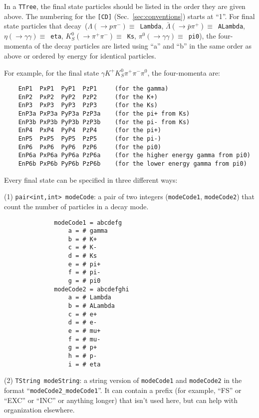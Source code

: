 \documentclass[11pt]{article}
\begin{document}
In a {\tt TTree}, the final state particles should be listed in the order they are given above.  The numbering for the {\tt [CD]} (Sec.~\ref{sec:conventions}) starts at ``1''.  For final state particles that decay~($\Lambda (\to p \pi^-) \equiv $~{\tt Lambda}, 
$\bar{\Lambda} (\to \bar{p} \pi^+) \equiv $~{\tt ALambda}, $\eta (\to \gamma\gamma) \equiv $~{\tt eta}, $K^0_S (\to \pi^+\pi^-) \equiv $~{\tt Ks}, $\pi^0 (\to \gamma\gamma) \equiv $~{\tt pi0}), the four-momenta of the decay particles are listed using ``a'' and ``b'' in the same order as above or ordered by energy for identical particles.

For example, for the final state $\gamma K^+ K^0_S \pi^+ \pi^- \pi^0$, the four-momenta are:
\begin{verbatim}
    EnP1  PxP1  PyP1  PzP1     (for the gamma)
    EnP2  PxP2  PyP2  PzP2     (for the K+)
    EnP3  PxP3  PyP3  PzP3     (for the Ks)
    EnP3a PxP3a PyP3a PzP3a    (for the pi+ from Ks)
    EnP3b PxP3b PyP3b PzP3b    (for the pi- from Ks)
    EnP4  PxP4  PyP4  PzP4     (for the pi+)
    EnP5  PxP5  PyP5  PzP5     (for the pi-)
    EnP6  PxP6  PyP6  PzP6     (for the pi0)
    EnP6a PxP6a PyP6a PzP6a    (for the higher energy gamma from pi0)
    EnP6b PxP6b PyP6b PzP6b    (for the lower energy gamma from pi0)
\end{verbatim}





Every final state can be specified in three different ways:

(1) {\tt pair<int,int> modeCode}: a pair of two integers ({\tt modeCode1}, {\tt modeCode2}) that count the number of particles in a decay mode.
\begin{verbatim}
              modeCode1 = abcdefg
                  a = # gamma
                  b = # K+
                  c = # K-
                  d = # Ks
                  e = # pi+
                  f = # pi-
                  g = # pi0
              modeCode2 = abcdefghi
                  a = # Lambda
                  b = # ALambda
                  c = # e+
                  d = # e-
                  e = # mu+
                  f = # mu-
                  g = # p+
                  h = # p-
                  i = # eta
\end{verbatim}
(2) {\tt TString modeString}: a string version of {\tt modeCode1} and {\tt modeCode2} in the format ``{\tt modeCode2\_modeCode1}''.  It can contain a prefix (for example, ``FS'' or ``EXC'' or ``INC'' or anything longer) that isn't used here, but can help with organization elsewhere.  
\end{document}
